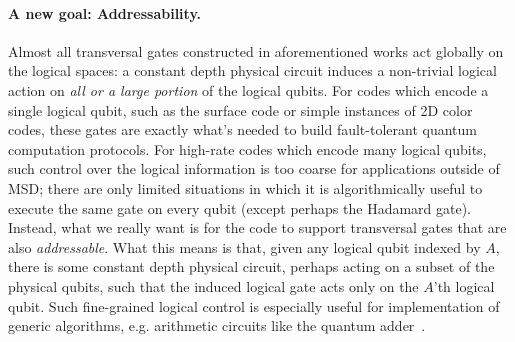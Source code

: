 \documentclass[11pt]{article}
\theoremstyle{definition}
\begin{document}
    \paragraph{A new goal: Addressability.} 
    Almost all transversal gates constructed in aforementioned works act globally on the logical spaces: a constant depth physical circuit induces a non-trivial logical action on \emph{all or a large portion} of the logical qubits.
    For codes which encode a single logical qubit, such as the surface code or simple instances of 2D color codes, these gates are exactly what's needed to build fault-tolerant quantum computation protocols.
    For high-rate codes which encode many logical qubits, such control over the logical information is too coarse for applications outside of MSD;
    there are only limited situations in which it is algorithmically useful to execute the same gate on every qubit (except perhaps the Hadamard gate). 
    Instead, what we really want is for the code to support transversal gates that are also \emph{addressable}. 
    What this means is that, given any logical qubit indexed by $A$, there is some constant depth physical circuit, perhaps acting on a subset of the physical qubits, such that the induced logical gate acts only on the $A$'th logical qubit.
    Such fine-grained logical control is especially useful for implementation of generic algorithms, e.g. arithmetic circuits like the quantum adder~\cite{Gidney2018halvingcostof}.
    
\end{document}
